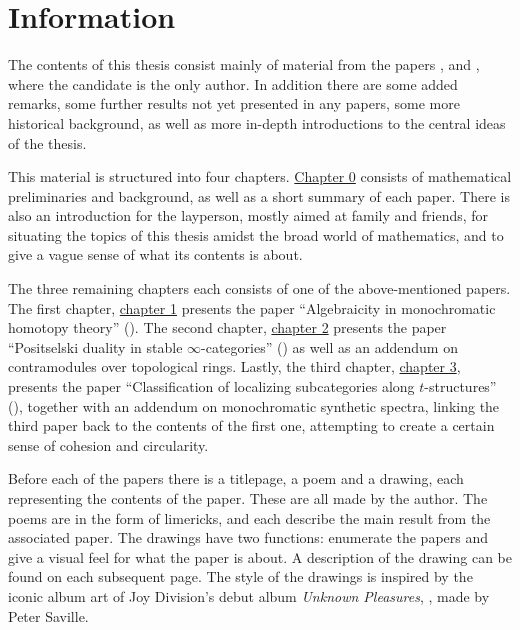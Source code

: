 
\section*{Information}

The contents of this thesis consist mainly of material from the papers \cite{aambo_2024_algebraicity}, \cite{aambo_2024_positselski} and \cite{aambo_2024_localizing}, where the candidate is the only author. In addition there are some added remarks, some further results not yet presented in any papers, some more historical background, as well as more in-depth introductions to the central ideas of the thesis. 

This material is structured into four chapters. \hyperref[ch0]{Chapter 0} consists of mathematical preliminaries and background, as well as a short summary of each paper. There is also an introduction for the layperson, mostly aimed at family and friends, for situating the topics of this thesis amidst the broad world of mathematics, and to give a vague sense of what its contents is about.  

The three remaining chapters each consists of one of the above-mentioned papers. The first chapter, \hyperref[ch1]{chapter 1} presents the paper ``Algebraicity in monochromatic homotopy theory'' (\cite{aambo_2024_algebraicity}). The second chapter, \hyperref[ch2]{chapter 2} presents the paper ``Positselski duality in stable $\infty$-categories'' (\cite{aambo_2024_positselski}) as well as an addendum on contramodules over topological rings. Lastly, the third chapter, \hyperref[ch3]{chapter 3}, presents the paper ``Classification of localizing subcategories along $t$-structures'' (\cite{aambo_2024_localizing}), together with an addendum on monochromatic synthetic spectra, linking the third paper back to the contents of the first one, attempting to create a certain sense of cohesion and circularity. 

Before each of the papers there is a titlepage, a poem and a drawing, each representing the contents of the paper. These are all made by the author. The poems are in the form of limericks, and each describe the main result from the associated paper. The drawings have two functions: enumerate the papers and give a visual feel for what the paper is about. A description of the drawing can be found on each subsequent page. The style of the drawings is inspired by the iconic album art of Joy Division's debut album \emph{Unknown Pleasures}, \cite{joy-division_79}, made by Peter Saville. 
